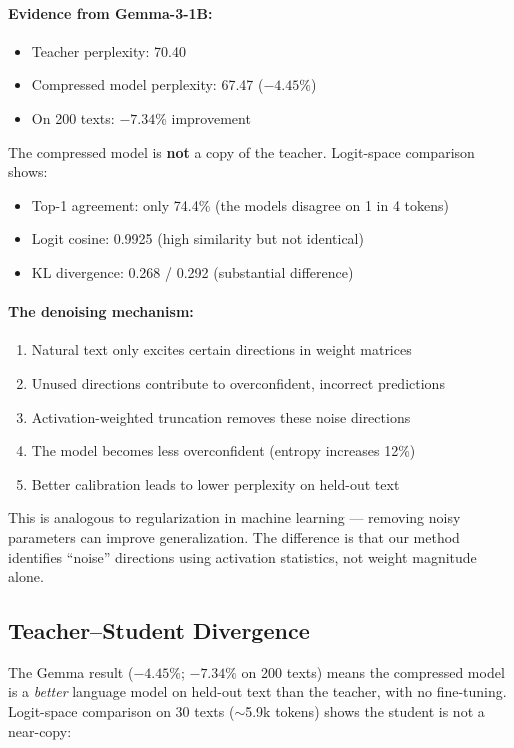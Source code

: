 \documentclass[11pt]{article}
\begin{document}
\paragraph{Evidence from Gemma-3-1B:}
\begin{itemize}
  \item Teacher perplexity: 70.40
  \item Compressed model perplexity: 67.47 ($-4.45\%$)
  \item On 200 texts: $-7.34\%$ improvement
\end{itemize}

The compressed model is \textbf{not} a copy of the teacher. Logit-space
comparison shows:
\begin{itemize}
  \item Top-1 agreement: only 74.4\% (the models disagree on 1 in 4 tokens)
  \item Logit cosine: 0.9925 (high similarity but not identical)
  \item KL divergence: 0.268 / 0.292 (substantial difference)
\end{itemize}

\paragraph{The denoising mechanism:}
\begin{enumerate}
  \item Natural text only excites certain directions in weight matrices
  \item Unused directions contribute to overconfident, incorrect predictions
  \item Activation-weighted truncation removes these noise directions
  \item The model becomes less overconfident (entropy increases 12\%)
  \item Better calibration leads to lower perplexity on held-out text
\end{enumerate}

This is analogous to regularization in machine learning --- removing noisy
parameters can improve generalization. The difference is that our method
identifies ``noise'' directions using activation statistics, not weight
magnitude alone.

\subsection{Teacher--Student Divergence}

The Gemma result ($-4.45\%$; $-7.34\%$ on 200 texts) means the compressed
model is a \emph{better} language model on held-out text than the teacher,
with no fine-tuning. Logit-space comparison on 30 texts ($\sim$5.9k tokens)
shows the student is not a near-copy:
\end{document}
